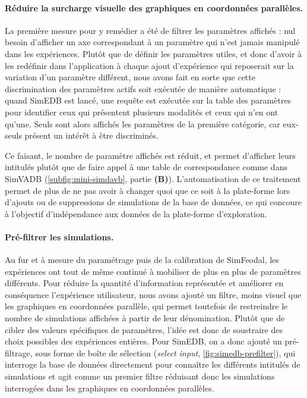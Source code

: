 \paragraph{Réduire la surcharge visuelle des graphiques en coordonnées parallèles.}

La première mesure pour y remédier a été de filtrer les paramètres affichés : nul besoin d'afficher un axe correspondant à un paramètre qui n'est jamais manipulé dans les expériences.
Plutôt que de définir les paramètres \og utiles\fg{}, et donc d'avoir à les redéfinir dans l'application à chaque ajout d'expérience qui reposerait sur la variation d'un paramètre différent, nous avons fait en sorte que cette discrimination des paramètres \og actifs\fg{} soit exécutée de manière automatique :
quand SimEDB est lancé, une requête est exécutée sur la table des paramètres pour identifier ceux qui présentent plusieurs modalités et ceux qui n'en ont qu'une.
Seuls sont alors affichés les paramètres de la première catégorie, car eux-seuls présent un intérêt à être discriminés.

Ce faisant, le nombre de paramètre affichés est réduit, et permet d'afficher leurs intitulés plutôt que de faire appel à une table de correspondance comme dans SimVADB (\cref{subfig:mini-simdavb}, partie \textbf{(B)}).
L'automatisation de ce traitement permet de plus de ne pas avoir à changer quoi que ce soit à la plate-forme lors d'ajouts ou de suppressions de simulations de la base de données, ce qui concoure à l'objectif d'indépendance aux données de la plate-forme d'exploration.

\paragraph{Pré-filtrer les simulations.}

Au fur et à mesure du paramétrage puis de la calibration de SimFeodal, les expériences ont tout de même continué à mobiliser de plus en plus de paramètres différents.
Pour réduire la quantité d'information représentée et améliorer en conséquence \og l'expérience utilisateur\fg{}, nous avons ajouté un filtre, moins visuel que les graphiques en coordonnées parallèle, qui permet toutefois de restreindre le nombre de simulations affichées à partir de leur dénomination.
Plutôt que de cibler des valeurs spécifiques de paramètres, l'idée est donc de soustraire des choix possibles des expériences entières.
Pour SimEDB, on a donc ajouté un pré-filtrage, sous forme de \og boîte de sélection\fg{} (\textit{select input}, \cref{fig:simedb-prefilter}), qui interroge la base de données directement pour connaître les différents intitulés de simulations et agit comme un premier filtre réduisant donc les simulations interrogées dans les graphiques en coordonnées parallèles.

